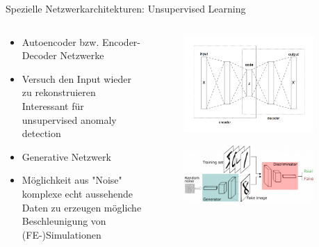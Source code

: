 \documentclass[aspectratio=1610, xcolor=dvipsnames, 9pt]{beamer}
\begin{document}
      \begin{frame}{Spezielle Netzwerkarchitekturen: Unsupervised Learning}
        \begin{columns}
          \begin{column}{0.6\textwidth}
            \begin{itemize}
              \item Autoencoder bzw. Encoder-Decoder Netzwerke \newline
              \item Versuch den Input wieder zu rekonstruieren \rightarrow Interessant für unsupervised anomaly detection \newline 
              \item Generative Netzwerk \newline
              \item Möglichkeit aus "Noise" komplexe echt aussehende Daten zu erzeugen \rightarrow mögliche Beschleunigung von (FE-)Simulationen
            \end{itemize}
          \end{column}
           \begin{column}{0.4\textwidth}
             \begin{figure}
               \centering
                           \includegraphics[width=0.9\textwidth]{images/Autoencoder.png}
               \end{figure}
               \begin{figure}
                \centering
                            \includegraphics[width=0.9\textwidth]{images/GAN.png}
                \end{figure}
            \end{column}
        \end{columns}
      \end{frame} 
\end{document}
